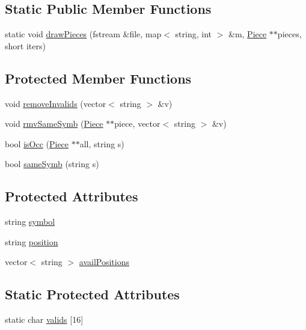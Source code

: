 \subsection*{Static Public Member Functions}
\begin{DoxyCompactItemize}
\item 
static void \hyperlink{class_piece_a0cd78824f4ad57ce5772ddaf28b152b0}{draw\+Pieces} (fstream \&file, map$<$ string, int $>$ \&m, \hyperlink{class_piece}{Piece} $\ast$$\ast$pieces, short iters)
\end{DoxyCompactItemize}
\subsection*{Protected Member Functions}
\begin{DoxyCompactItemize}
\item 
void \hyperlink{class_piece_a4e89ae7011b06d46dc4ba76b6f676791}{remove\+Invalids} (vector$<$ string $>$ \&v)
\item 
void \hyperlink{class_piece_a5af40f3573b8963bdd202a750268c3e9}{rmv\+Same\+Symb} (\hyperlink{class_piece}{Piece} $\ast$$\ast$piece, vector$<$ string $>$ \&v)
\item 
bool \hyperlink{class_piece_afbd16578f663257d4dea5beefcdcecb4}{is\+Occ} (\hyperlink{class_piece}{Piece} $\ast$$\ast$all, string s)
\item 
bool \hyperlink{class_piece_afc9b134f63e2b3d5891e2ba0699edf95}{same\+Symb} (string s)
\end{DoxyCompactItemize}
\subsection*{Protected Attributes}
\begin{DoxyCompactItemize}
\item 
string \hyperlink{class_piece_ab1063e521716374d9a97eddf169be096}{symbol}
\item 
string \hyperlink{class_piece_a1b93d0ecc14e15fc7f3fb5def518502a}{position}
\item 
vector$<$ string $>$ \hyperlink{class_piece_aba40a894958b12d2e9f2d3b8ac192316}{avail\+Positions}
\end{DoxyCompactItemize}
\subsection*{Static Protected Attributes}
\begin{DoxyCompactItemize}
\item 
static char \hyperlink{class_piece_af96dfaa19d200cac55748774dbb1a56a}{valids} \mbox{[}16\mbox{]}
\end{DoxyCompactItemize}


